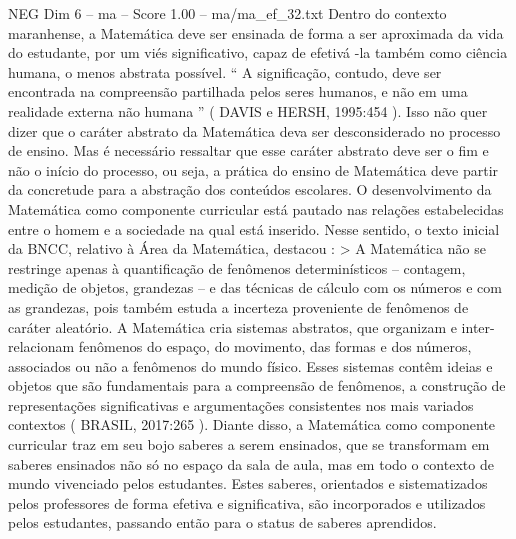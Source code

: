 \begin{textsample}{NEG Dim 6 – ma – Score 1.00 – ma/ma\_ef\_32.txt}
Dentro do contexto maranhense, a Matemática deve ser ensinada de forma a ser aproximada da vida do estudante, por um viés significativo, capaz de efetivá -la também como ciência humana, o menos abstrata possível. “ A significação, contudo, deve ser encontrada na compreensão partilhada pelos seres humanos, e não em uma realidade externa não humana ” ( DAVIS e HERSH, 1995:454 ).
Isso não quer dizer que o caráter abstrato da Matemática deva ser desconsiderado no processo de ensino.
Mas é necessário ressaltar que esse caráter abstrato deve ser o fim e não o início do processo, ou seja, a prática do ensino de Matemática deve partir da concretude para a abstração dos conteúdos escolares.
O desenvolvimento da Matemática como componente curricular está pautado nas relações estabelecidas entre o homem e a sociedade na qual está inserido.
Nesse sentido, o texto inicial da BNCC, relativo à Área da Matemática, destacou : > A Matemática não se restringe apenas à quantificação de fenômenos determinísticos – contagem, medição de objetos, grandezas – e das técnicas de cálculo com os números e com as grandezas, pois também estuda a incerteza proveniente de fenômenos de caráter aleatório.
A Matemática cria sistemas abstratos, que organizam e inter-relacionam fenômenos do espaço, do movimento, das formas e dos números, associados ou não a fenômenos do mundo físico.
Esses sistemas contêm ideias e objetos que são fundamentais para a compreensão de fenômenos, a construção de representações significativas e argumentações consistentes nos mais variados contextos ( BRASIL, 2017:265 ).
Diante disso, a Matemática como componente curricular traz em seu bojo saberes a serem ensinados, que se transformam em saberes ensinados não só no espaço da sala de aula, mas em todo o contexto de mundo vivenciado pelos estudantes.
Estes saberes, orientados e sistematizados pelos professores de forma efetiva e significativa, são incorporados e utilizados pelos estudantes, passando então para o status de saberes aprendidos.

\end{textsample}
